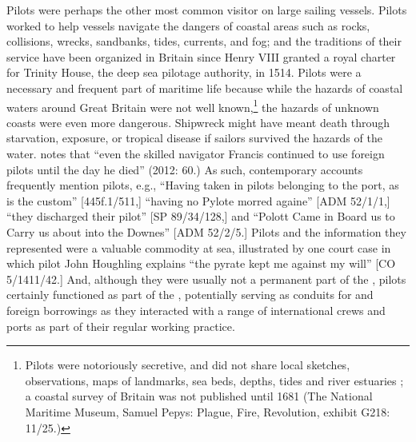 Pilots were perhaps the other most common visitor on large sailing vessels. Pilots worked to help vessels navigate the dangers of coastal areas such as rocks, collisions, wrecks, sandbanks, tides, currents, and fog; and the traditions of their service have been organized in Britain since Henry VIII granted a royal charter for Trinity House, the deep sea pilotage authority, in 1514. Pilots were a necessary and frequent part of maritime life because while the hazards of coastal waters around Great Britain were not well known,\footnote{Pilots were notoriously secretive, and did not share local sketches, observations, maps of landmarks, sea beds, depths, tides and river estuaries \citep[64]{Bicheno2012}; a coastal survey of Britain was not published until 1681 (The National Maritime Museum, Samuel Pepys: Plague, Fire, Revolution, exhibit G218: 11/25.)}  the hazards of unknown coasts were even more dangerous. Shipwreck might have meant death through starvation, exposure, or tropical disease if sailors survived the hazards of the water. \citeauthor{Bicheno2012} notes that “even the skilled navigator Francis  continued to use foreign pilots until the day he died” (2012: 60.) As such, contemporary accounts frequently mention pilots, e.g., “Having taken in pilots belonging to the port, as is the custom” [445f.1/511,] “having no Pylote morred againe” [ADM 52/1/1,] “they discharged their pilot” [SP 89/34/128,] and “Polott Came in Board us to Carry us about into the Downes” [ADM 52/2/5.] Pilots and the information they represented were a valuable commodity at sea, illustrated by one court case in which pilot John Houghling explains “the pyrate kept me against my will” [CO 5/1411/42.] And, although they were usually not a permanent part of the , pilots certainly functioned as part of the , potentially serving as conduits for  and foreign borrowings as they interacted with a range of international crews and ports as part of their regular working practice. 

